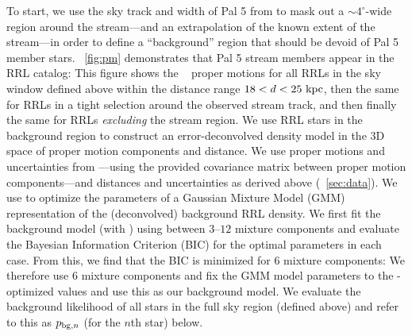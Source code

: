 \documentclass[twocolumn]{aastex63}
\begin{document}
To start, we use the sky track and width of Pal 5 from \citet{Bonaca:2019} to mask out a $\sim4^\circ$-wide region around the stream---and an extrapolation of the known extent of the stream---in order to define a ``background'' region that should be devoid of Pal 5 member stars.
\figurename~\ref{fig:pm} demonstrates that Pal 5 stream members appear in the RRL catalog: This figure shows the \Gaia\  proper motions for all RRLs in the sky window defined above within the distance range $18 < d < 25~\mathrm{kpc}$, then the same for RRLs in a tight selection around the observed stream track, and then finally the same for RRLs \emph{excluding} the stream region.
We use RRL stars in the background region to construct an error-deconvolved density model in the 3D space of proper motion components and distance.
We use proper motions and uncertainties from \Gaia---using the provided covariance matrix between proper motion components---and distances and uncertainties as derived above (\sectionname~\ref{sec:data}).
We use  \citep[;][]{Bovy:XD} to optimize the parameters of a Gaussian Mixture Model (GMM) representation of the (deconvolved) background RRL density.
We first fit the background model (with ) using between $3$--$12$ mixture components and evaluate the Bayesian Information Criterion (BIC) for the optimal parameters in each case.
From this, we find that the BIC is minimized for 6 mixture components: We therefore use 6 mixture components and fix the GMM model parameters to the -optimized values and use this as our background model.
We evaluate the background likelihood of all stars in the full sky region (defined above) and refer to this as $p_{{\rm bg}, n}$ (for the $n$th star) below.
\end{document}
